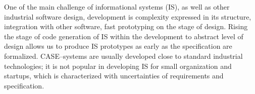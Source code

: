 \documentclass[conference]{IEEEtran}
\begin{document}




One of the main challenge of informational systems (IS), as well as other industrial software design, development is complexity expressed in its structure, integration with other software, fast prototyping on the stage of design.  Rising the stage of code generation of IS within the development to abstract level of design allows us to produce IS prototypes as early as the specification are formalized.  CASE--systems are usually developed close to standard industrial technologies; it is not popular in developing IS for small organization and startups, which is characterized with uncertainties of requirements and specification.
\end{document}
